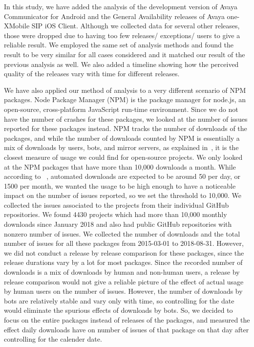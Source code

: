 \documentclass[smallextended]{svjour3}       %
\begin{document}
In this study, we have added the analysis of the development version of Avaya Communicator for Android and the
General Availability releases of Avaya one-X\textregistered  Mobile SIP iOS Client. Although we collected data for several other releases, those were dropped due to having too few releases/ exceptions/ users to give a reliable result. We employed the same set of analysis methods and found the result to be very similar for all cases considered and it matched our result of the previous analysis as well. We also added a timeline showing how the perceived quality of the releases vary with time for different releases.  

We have also applied our method of analysis to a very different scenario of NPM packages. Node Package Manager (NPM) is the package manager for node.js, an open-source, cross-platform JavaScript run-time environment. 
Since we do not have the number of crashes for these packages, we looked at the number of issues reported for these packages instead.
NPM tracks the number of downloads of the packages, and while the number of downloads counted by NPM is essentially a mix of downloads by users, bots, and mirror servers, as explained in~\cite{npmdl}, it is the closest measure of usage we could find for open-source projects. We only looked at the NPM packages that have more than 10,000 downloads a month. While according to ~\cite{npmdl}, automated downloads are expected to be around 50 per day, or 1500 per month, we wanted the usage to be high enough to have a noticeable impact on the number of issues reported, so we set the threshold to 10,000. We collected the issues associated to the projects from their individual GitHub repositories. We found 4430 projects which had more than 10,000 monthly downloads since January 2018 and also had public GitHub repositories with nonzero number of issues. 
We collected the number of downloads and the total number of issues for all these packages from 2015-03-01 to 2018-08-31. However, we did not conduct a release by release comparison for these packages, since the release durations vary by a lot for most packages. Since the recorded number of downloads is a mix of downloads by human and non-human users, a release by release comparison would not give a reliable picture of the effect of actual usage by human users on the number of issues. However, the number of downloads by bots are relatively stable and vary only with time, so controlling for the date would eliminate the spurious effects of downloads by bots. So, we decided to focus on the entire packages instead of releases of the packages, and measured the effect daily downloads have on number of issues of that package on that day after controlling for the calender date. 
\end{document}
